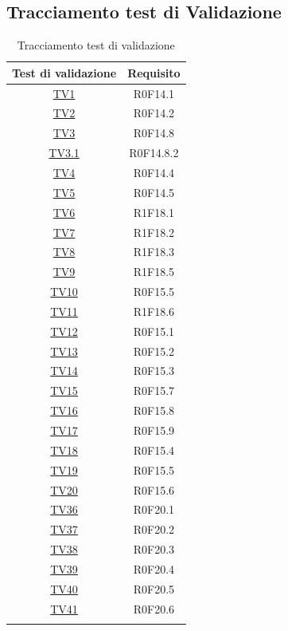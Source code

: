 \documentclass[../PianoDiQualifica.tex]{subfiles}
\begin{document}
\subsection{Tracciamento test di Validazione}
\normalsize
\begin{longtable}{|c|c|}
	\hline
	\textbf{Test di validazione} & \textbf{Requisito}\\
	\hline
	\endhead
	\hyperlink{TV1}{TV1} & R0F14.1  \\
	\hline
	\hyperlink{TV2}{TV2} & R0F14.2  \\
	\hline
	\hyperlink{TV3}{TV3} & R0F14.8   \\
	\hline
	\hyperlink{TV3.1}{TV3.1} & R0F14.8.2   \\
	\hline
	\hyperlink{TV4}{TV4} & R0F14.4   \\
	\hline
	\hyperlink{TV5}{TV5} & R0F14.5   \\
	\hline
	\hyperlink{TV6}{TV6} & R1F18.1   \\
	\hline
	\hyperlink{TV7}{TV7} & R1F18.2   \\
	\hline
	\hyperlink{TV8}{TV8} & R1F18.3   \\
	\hline
	\hyperlink{TV9}{TV9} & R1F18.5   \\
	\hline
	\hyperlink{TV10}{TV10} & R0F15.5   \\
	\hline
	\hyperlink{TV11}{TV11} & R1F18.6   \\
	\hline
	\hyperlink{TV12}{TV12} & R0F15.1   \\
	\hline
	\hyperlink{TV13}{TV13} & R0F15.2   \\
	\hline
	\hyperlink{TV14}{TV14} & R0F15.3   \\
	\hline
	\hyperlink{TV15}{TV15} & R0F15.7   \\
	\hline
	\hyperlink{TV16}{TV16} & R0F15.8   \\
	\hline
	\hyperlink{TV17}{TV17} & R0F15.9   \\
	\hline
	\hyperlink{TV18}{TV18} & R0F15.4   \\
	\hline
	\hyperlink{TV19}{TV19} & R0F15.5   \\
	\hline
	\hyperlink{TV20}{TV20} & R0F15.6   \\
	\hline
	\hyperlink{TV36}{TV36} & R0F20.1   \\
	\hline
	\hyperlink{TV37}{TV37} & R0F20.2   \\
	\hline
	\hyperlink{TV38}{TV38} & R0F20.3   \\
	\hline
	\hyperlink{TV39}{TV39} & R0F20.4   \\
	\hline
	\hyperlink{TV40}{TV40} & R0F20.5   \\
	\hline
	\hyperlink{TV41}{TV41} & R0F20.6  \\
	\hline
	\caption[Tracciamento test di validazione]{Tracciamento test di validazione}
	\label{tabella:TracciamentoTestValidazione}
\end{longtable}
	
\end{document}
